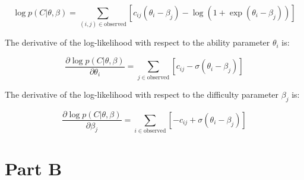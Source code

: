 \documentclass{article}
\begin{document}
\[
\log p(C | \theta, \beta) = \sum_{(i,j) \in \text{observed}} \left[ c_{ij} (\theta_i - \beta_j) - \log (1 + \exp(\theta_i - \beta_j)) \right]
\]

The derivative of the log-likelihood with respect to the ability parameter $\theta_i$ is:

\[
\frac{\partial \log p(C | \theta, \beta)}{\partial \theta_i} = \sum_{j \in \text{observed}} \left[ c_{ij} - \sigma(\theta_i - \beta_j) \right]
\]

The derivative of the log-likelihood with respect to the difficulty parameter $\beta_j$ is:

\[
\frac{\partial \log p(C | \theta, \beta)}{\partial \beta_j} = \sum_{i \in \text{observed}} \left[ - c_{ij} + \sigma(\theta_i - \beta_j) \right]
\]


\newpage
\section*{Part B}
\end{document}
